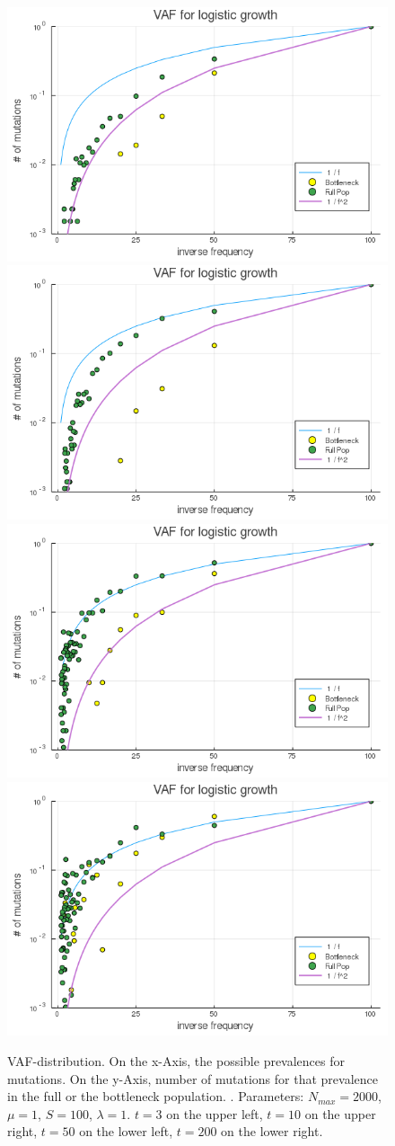 \documentclass{article}
\numberwithin{equation}{subsection}
\begin{document}
\begin{figure}[h!]
	\centering
	\includegraphics[width=0.49\linewidth]{Figures/LogGrowth/document/LogGrowthBasic/LogVarTimesC_N2000_mu1_t3_d1_C0}
	\includegraphics[width=0.49\linewidth]{Figures/LogGrowth/document/LogGrowthBasic/LogVarTimesC_N2000_mu1_t10_d1_C0}
	\includegraphics[width=0.49\linewidth]{Figures/LogGrowth/document/LogGrowthBasic/LogVarTimesC_N2000_mu1_t50_d1_C0}
	\includegraphics[width=0.49\linewidth]{Figures/LogGrowth/document/LogGrowthBasic/LogVarTimesC_N2000_mu1_t200_d1_C0}
	
	\caption{VAF-distribution. On the x-Axis, the possible prevalences for mutations. On the y-Axis, number of mutations for that prevalence in the full or the bottleneck population. . Parameters: $ N_{max} = 2000$, $\mu = 1 $, $ S = 100 $, $ \lambda = 1$. $ t =3 $ on the upper left, $ t= 10 $ on the upper right, $ t =50 $ on the lower left, $ t= 200 $ on the lower right.}
	\label{fig::VAF2}
\end{figure}
	
\end{document}
